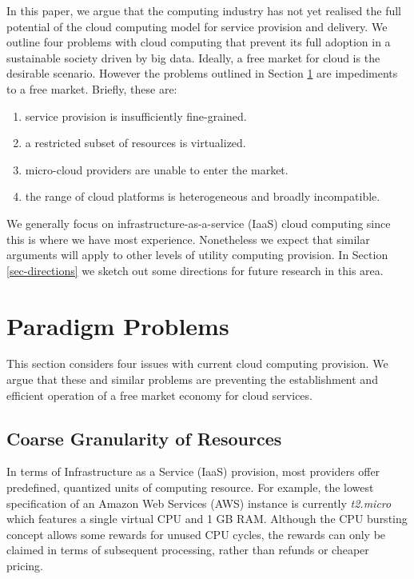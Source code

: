\documentclass[conference,10pt]{IEEEtran}
\begin{document}
In this paper, we argue that the computing industry has not yet realised the full potential of the cloud computing model for service provision and delivery. We outline four problems with cloud computing that prevent its full adoption in a sustainable society driven by big data.
Ideally, a free market for cloud is the desirable scenario. However the problems outlined in Section \ref{sec-probs}
are impediments to a free market. Briefly, these are:
\begin{enumerate}
\item service provision is insufficiently fine-grained.
\item a restricted subset of resources is virtualized.
\item micro-cloud providers are unable to enter the market.
\item the range of cloud platforms is heterogeneous and broadly incompatible.
\end{enumerate}

We generally focus on infrastructure-as-a-service (IaaS) cloud computing since this is where we have most experience. Nonetheless we expect that similar arguments will apply to other levels of utility computing provision.
%
In Section \ref{sec-directions} we sketch out some directions for future research in this area.


\section{Paradigm Problems}
\label{sec-probs}

This section considers four issues with current cloud computing provision.
We argue that these and similar problems are preventing the establishment and efficient operation of a free market economy for cloud services.



\subsection{Coarse Granularity of Resources}

In terms of Infrastructure as a Service (IaaS) provision, most providers offer predefined, quantized units of computing resource. For example, the lowest specification of an Amazon Web Services (AWS) instance is currently \emph{t2.micro} which features a single virtual CPU and 1 GB RAM. Although the CPU bursting concept allows some rewards for unused CPU cycles, the rewards can only be claimed in terms of subsequent processing, rather than refunds or cheaper pricing.  
\end{document}
